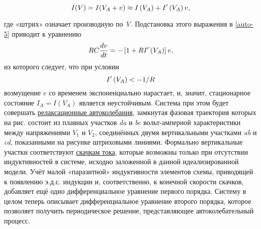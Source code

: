 \begin{equation} 
	\eqmark{auto-7}
	I(V)=I(V_A + v)\approx I\left( V_A \right)+{I}'\left( V_A \right)v, 
\end{equation}

где «штрих» означает производную по \emph{V}. Подстановка этого выражения в \eqref{auto-5} приводит к уравнению
\begin{equation} 
	\eqmark{auto-8}
	RC\frac{dv}{dt}=-\left[ 1+R{I}'\left( V_A \right) \right]v, 
\end{equation}
из которого следует, что при условии
\begin{equation} 
	\eqmark{auto-9}
	I'\left( V_A \right) <- {1}/{R}
\end{equation}
возмущение $v$ со временем экспоненциально нарастает, и, значит, стационарное состояние $I_A=I(V_A)$ является неустойчивым. Система при этом будет совершать \underline{релаксационные автоколебания}, замкнутая фазовая траектория которых на рис.  состоит из плавных участков \emph{da} и \emph{bc} вольт-амперной характеристики между напряжениями $V_1$ и $V_2$, соединённых двумя вертикальными участками \emph{ab} и \emph{cd}, показанными на рисунке штриховыми линиями. Формально вертикальные участки соответствуют \underline{скачкам тока}, которые возможны только при отсутствии индуктивностей в системе, исходно заложенной в данной идеализированной модели. Учёт малой «паразитной» индуктивности элементов схемы, приводящей к появлению э.д.с. индукции и, соответственно, к конечной скорости скачков, добавляет ещё одно дифференциальное уравнение первого порядка. Систему в целом теперь описывает дифференциальное уравнение второго порядка, которое позволяет получить периодическое решение, представляющее автоколебательный процесс.